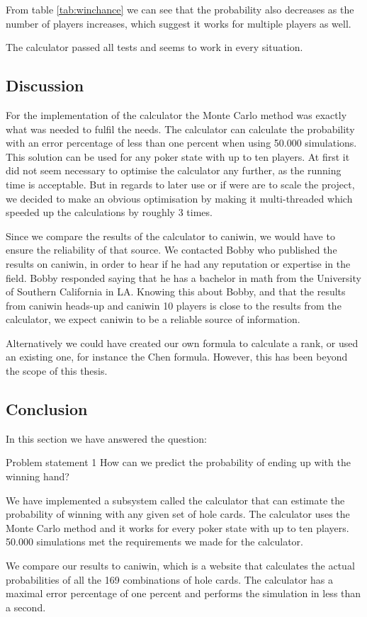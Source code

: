 From table \ref{tab:winchance} we can see that the probability also decreases as the number of players increases, which suggest it works for multiple players as well.

The calculator passed all tests and seems to work in every situation. 

\subsection{Discussion}
For the implementation of the calculator the Monte Carlo method was exactly what was needed to fulfil the needs. The calculator can calculate the probability with an error percentage of less than one percent when using 50.000 simulations. This solution can be used for any poker state with up to ten players. At first it did not seem necessary to optimise the calculator any further, as the running time is acceptable. But in regards to later use or if were are to scale the project, we decided to make an obvious optimisation by making it multi-threaded which speeded up the calculations by roughly 3 times.	

Since we compare the results of the calculator to caniwin, we would have to ensure the reliability of that source. We contacted Bobby who published the results on caniwin, in order to hear if he had any reputation or expertise in the field. Bobby responded saying that he has a bachelor in math from the University of Southern California in LA. Knowing this about Bobby, and that the results from caniwin heads-up and caniwin 10 players is close to the results from the calculator, we expect caniwin to be a reliable source of information.

Alternatively we could have created our own formula to calculate a rank, or used an existing one, for instance the Chen formula. However, this has been beyond the scope of this thesis.

\subsection{Conclusion}
In this section we have answered the question:
\vspace{4mm}
\begin{statementBox2}{Problem statement 1}
How can we predict the probability of ending up with the winning hand?
\end{statementBox2}
\vspace{4mm}

We have implemented a subsystem called the calculator that can estimate the probability of winning with any given set of hole cards. The calculator uses the Monte Carlo method and it works for every poker state with up to ten players. 50.000 simulations  met the requirements we made for the calculator.   

We compare our results to caniwin, which is a website that calculates the actual probabilities of all the 169 combinations of hole cards. The calculator has a maximal error percentage of one percent and performs the simulation in less than a second.
